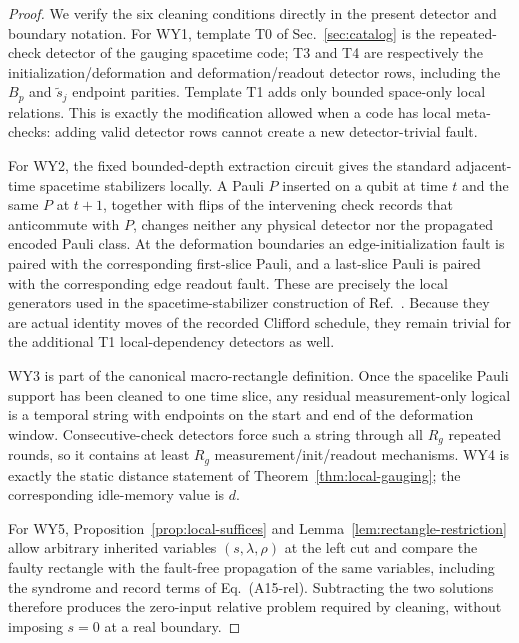 \documentclass[aps,prx,reprint,superscriptaddress,nofootinbib,floatfix,longbibliography]{revtex4-2}
\theoremstyle{definition}
\begin{document}
\begin{proof}
We verify the six cleaning conditions directly in the present detector and boundary notation.  For WY1, template T0 of Sec.~\ref{sec:catalog} is the repeated-check
detector of the gauging spacetime code; T3 and T4 are respectively the
initialization/deformation and deformation/readout detector rows, including
the $B_p$ and $\widetilde s_j$ endpoint parities.  Template T1 adds only
bounded space-only local relations.  This is exactly the modification allowed
when a code has local meta-checks: adding valid detector rows cannot create a
new detector-trivial fault.

For WY2, the fixed bounded-depth extraction circuit gives the standard
adjacent-time spacetime stabilizers locally.  A Pauli $P$ inserted on a qubit
at time $t$ and the same $P$ at $t+1$, together with flips of the intervening
check records that anticommute with $P$, changes neither any physical detector
nor the propagated encoded Pauli class.  At the deformation boundaries an
edge-initialization fault is paired with the corresponding first-slice Pauli,
and a last-slice Pauli is paired with the corresponding edge readout fault.
These are precisely the local generators used in the spacetime-stabilizer
construction of Ref.~\cite{WilliamsonYoderGauging}.  Because they are actual
identity moves of the recorded Clifford schedule, they remain trivial for the
additional T1 local-dependency detectors as well.

WY3 is part of the canonical macro-rectangle definition.  Once the
spacelike Pauli support has been cleaned to one time slice, any residual
measurement-only logical is a temporal string with endpoints on the start and
end of the deformation window.  Consecutive-check detectors force such a
string through all $R_g$ repeated rounds, so it contains at least $R_g$
measurement/init/readout mechanisms.  WY4 is exactly the static distance
statement of Theorem~\ref{thm:local-gauging}; the corresponding
idle-memory value is $d$.

For WY5, Proposition~\ref{prop:local-suffices} and
Lemma~\ref{lem:rectangle-restriction} allow arbitrary inherited
variables $(s,\lambda,\rho)$ at the left cut and compare the faulty rectangle
with the fault-free propagation of the same variables, including the syndrome
and record terms of Eq.~(A15-rel).  Subtracting the two solutions
therefore produces the zero-input relative problem required by cleaning,
without imposing $s=0$ at a real boundary.


\end{proof}
\end{document}
